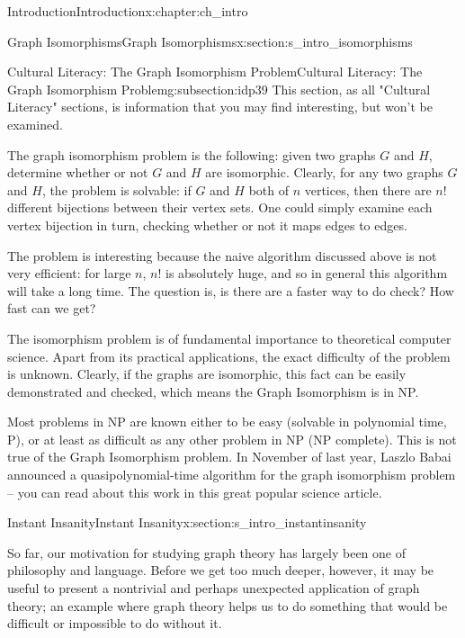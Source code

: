 \documentclass[oneside,10pt,]{book}
\numberwithin{equation}{section}
\begin{document}
\begin{chapterptx}{Introduction}{}{Introduction}{}{}{x:chapter:ch_intro}
\begin{sectionptx}{Graph Isomorphisms}{}{Graph Isomorphisms}{}{}{x:section:s_intro_isomorphisms}
%
%
\typeout{************************************************}
\typeout{************************************************}
%
\begin{subsectionptx}{Cultural Literacy: The Graph Isomorphism Problem}{}{Cultural Literacy: The Graph Isomorphism Problem}{}{}{g:subsection:idp39}
This section, as all "Cultural Literacy" sections, is information that you may find interesting, but won't be examined.%
\par
The graph isomorphism problem is the following: given two graphs \(G\) and \(H\), determine whether or not \(G\) and \(H\) are isomorphic. Clearly, for any two graphs \(G\) and \(H\), the problem is solvable: if \(G\) and \(H\) both of \(n\) vertices, then there are \(n!\) different bijections between their vertex sets.  One could simply examine each vertex bijection in turn, checking whether or not it maps edges to edges.%
\par
The problem is interesting because the naive algorithm discussed above is not very efficient: for large \(n\), \(n!\) is absolutely huge, and so in general this algorithm will take a long time.  The question is, is there are a faster way to do check? How fast can we get?%
\par
The isomorphism problem is of fundamental importance to theoretical computer science. Apart from its practical applications, the exact difficulty of the problem is unknown. Clearly, if the graphs are isomorphic, this fact can be easily demonstrated and checked, which means the Graph Isomorphism is in NP.%
\par
Most problems in NP are known either to be easy (solvable in polynomial time, P), or at least as difficult as any other problem in NP (NP complete). This is not true of the Graph Isomorphism problem. In November of last year, Laszlo Babai announced a quasipolynomial-time algorithm for the graph isomorphism problem – you can read about this work in this great popular science article.%
\end{subsectionptx}
\end{sectionptx}
%
%
\typeout{************************************************}
\typeout{************************************************}
%
\begin{sectionptx}{Instant Insanity}{}{Instant Insanity}{}{}{x:section:s_intro_instantinsanity}
\begin{introduction}{}%
So far, our motivation for studying graph theory has largely been one of philosophy and language.  Before we get too much deeper, however, it may be useful to present a nontrivial and perhaps unexpected application of graph theory; an example where graph theory helps us to do something that would be difficult or impossible to do without it.%

\end{introduction}
\end{sectionptx}
\end{chapterptx}
\end{document}
